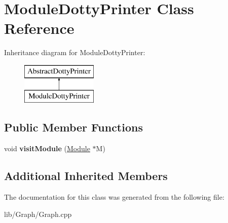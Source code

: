 \hypertarget{class_module_dotty_printer}{}\section{Module\+Dotty\+Printer Class Reference}
\label{class_module_dotty_printer}
Inheritance diagram for Module\+Dotty\+Printer\+:\begin{figure}[H]
\begin{center}
\leavevmode
\includegraphics[height=2.000000cm]{class_module_dotty_printer}
\end{center}
\end{figure}
\subsection*{Public Member Functions}
\begin{DoxyCompactItemize}
\item 
\mbox{\label{class_module_dotty_printer_a45ff130ec51523100550dee0886d8794}} 
void {\bfseries visit\+Module} (\hyperlink{classglow_1_1_module}{Module} $\ast$M)
\end{DoxyCompactItemize}
\subsection*{Additional Inherited Members}


The documentation for this class was generated from the following file\+:\begin{DoxyCompactItemize}
\item 
lib/\+Graph/Graph.\+cpp\end{DoxyCompactItemize}
